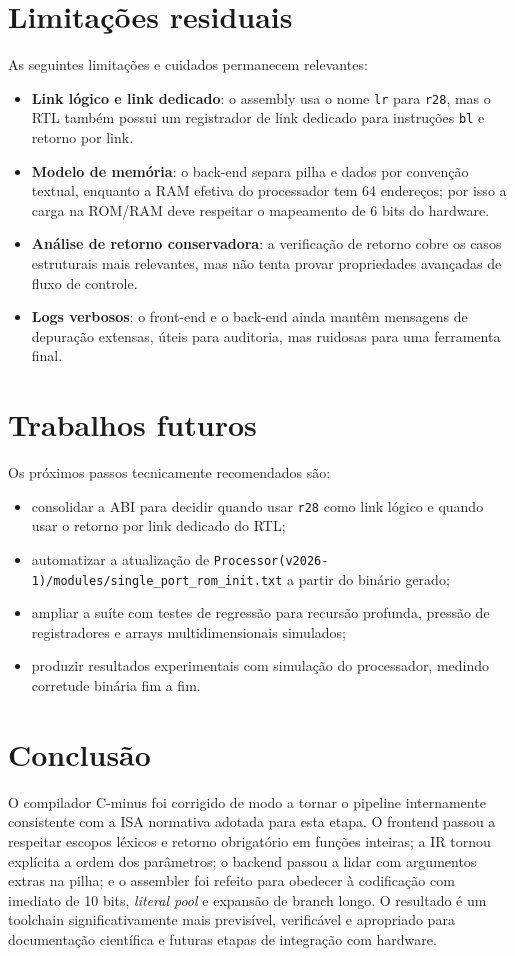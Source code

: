 \documentclass[12pt,a4paper]{article}
\begin{document}
\section{Limitações residuais}
\label{sec:limitacoes}
As seguintes limitações e cuidados permanecem relevantes:
\begin{itemize}[leftmargin=1.5em]
    \item \textbf{Link lógico e link dedicado}: o assembly usa o nome \texttt{lr} para \texttt{r28}, mas o RTL também possui um registrador de link dedicado para instruções \texttt{bl} e retorno por link.
    \item \textbf{Modelo de memória}: o back-end separa pilha e dados por convenção textual, enquanto a RAM efetiva do processador tem 64 endereços; por isso a carga na ROM/RAM deve respeitar o mapeamento de 6 bits do hardware.
    \item \textbf{Análise de retorno conservadora}: a verificação de retorno cobre os casos estruturais mais relevantes, mas não tenta provar propriedades avançadas de fluxo de controle.
    \item \textbf{Logs verbosos}: o front-end e o back-end ainda mantêm mensagens de depuração extensas, úteis para auditoria, mas ruidosas para uma ferramenta final.
\end{itemize}

\section{Trabalhos futuros}
Os próximos passos tecnicamente recomendados são:
\begin{itemize}[leftmargin=1.5em]
    \item consolidar a ABI para decidir quando usar \texttt{r28} como link lógico e quando usar o retorno por link dedicado do RTL;
    \item automatizar a atualização de \texttt{Processor(v2026-1)/modules/single\_port\_rom\_init.txt} a partir do binário gerado;
    \item ampliar a suíte com testes de regressão para recursão profunda, pressão de registradores e arrays multidimensionais simulados;
    \item produzir resultados experimentais com simulação do processador, medindo corretude binária fim a fim.
\end{itemize}

\section{Conclusão}
O compilador C-minus foi corrigido de modo a tornar o pipeline internamente consistente com a ISA normativa adotada para esta etapa. O frontend passou a respeitar escopos léxicos e retorno obrigatório em funções inteiras; a IR tornou explícita a ordem dos parâmetros; o backend passou a lidar com argumentos extras na pilha; e o assembler foi refeito para obedecer à codificação com imediato de 10 bits, \emph{literal pool} e expansão de branch longo. O resultado é um toolchain significativamente mais previsível, verificável e apropriado para documentação científica e futuras etapas de integração com hardware.
\end{document}
